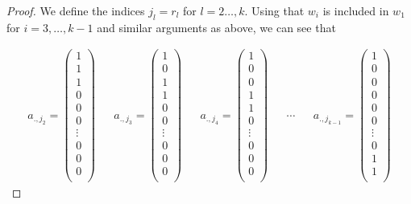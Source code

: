 \documentclass[a4paper,10pt]{report}
\theoremstyle{plain}
\theoremstyle{remark}
\theoremstyle{plain}
\begin{document}
\begin{proof}
	We define the indices $j_l = r_l$ for $l = 2 \ldots, k$.
	Using that $w_i$ is included in $w_1$ for $i = 3, \ldots, k-1$ and similar arguments as above, 
	we can see that 
	
	{\small
	\begin{align*}
			a_{.,j_2} = \begin{pmatrix}
		1\\
		1\\
		1\\
		0\\
		0\\
		0\\
		\vdots \\
		0\\
		0\\
		0\\
		\end{pmatrix}
		&&
			a_{.,j_3} = \begin{pmatrix}
		1\\
		0\\
		1\\
		1\\
		0\\
		0\\
		\vdots \\
		0\\
		0\\
		0\\
		\end{pmatrix}
		&&
			a_{.,j_4} = \begin{pmatrix}
		1\\
		0\\
		0\\
		1\\
		1\\
		0\\
		\vdots \\
		0\\
		0\\
		0\\
		\end{pmatrix}
		&&
		\cdots
		&&
			a_{.,j_{k-1}} = \begin{pmatrix}
		1\\
		0\\
		0\\
		0\\
		0\\
		0\\	
		\vdots \\
		0\\
		1\\
		1\\

\end{pmatrix}
\end{align*}}
\end{proof}
\end{document}
